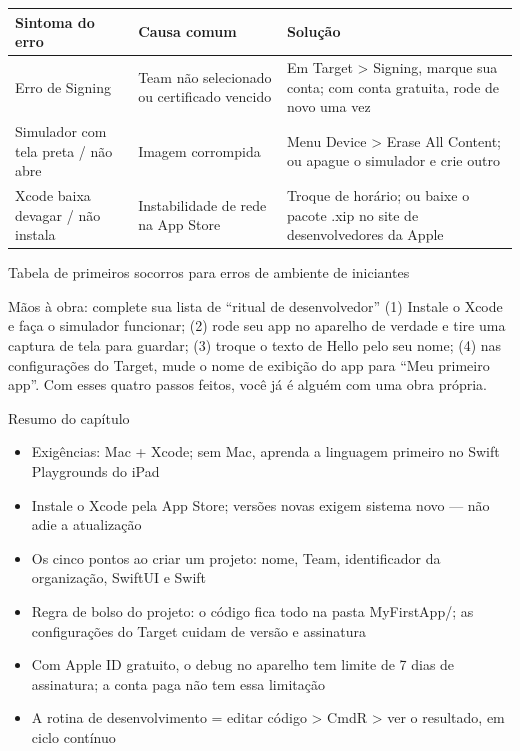 \begin{center}
\begin{tabularx}{\linewidth}{|X|X|X|}
\hline
\textbf{Sintoma do erro} & \textbf{Causa comum} & \textbf{Solução} \tabularnewline
\hline
Erro de Signing & Team não selecionado ou certificado vencido & Em Target > Signing, marque sua conta; com conta gratuita, rode de novo uma vez \tabularnewline
Simulador com tela preta / não abre & Imagem corrompida & Menu Device > Erase All Content; ou apague o simulador e crie outro \tabularnewline
Xcode baixa devagar / não instala & Instabilidade de rede na App Store & Troque de horário; ou baixe o pacote .xip no site de desenvolvedores da Apple \tabularnewline
\hline
\end{tabularx}
\end{center}

\begin{center}\small\color{gray}Tabela de primeiros socorros para erros de ambiente de iniciantes\end{center}

\begin{tcbpractice}{Mãos à obra: complete sua lista de “ritual de desenvolvedor”}
(1) Instale o Xcode e faça o simulador funcionar; (2) rode seu app no aparelho de verdade e tire uma captura de tela para guardar; (3) troque o texto de Hello pelo seu nome; (4) nas configurações do Target, mude o nome de exibição do app para “Meu primeiro app”. Com esses quatro passos feitos, você já é alguém com uma obra própria.

\end{tcbpractice}

\begin{tcbsummary}{Resumo do capítulo}
\begin{itemize}
  \item Exigências: Mac + Xcode; sem Mac, aprenda a linguagem primeiro no Swift Playgrounds do iPad
  \item Instale o Xcode pela App Store; versões novas exigem sistema novo — não adie a atualização
  \item Os cinco pontos ao criar um projeto: nome, Team, identificador da organização, SwiftUI e Swift
  \item Regra de bolso do projeto: o código fica todo na pasta MyFirstApp/; as configurações do Target cuidam de versão e assinatura
  \item Com Apple ID gratuito, o debug no aparelho tem limite de 7 dias de assinatura; a conta paga não tem essa limitação
  \item A rotina de desenvolvimento = editar código > CmdR > ver o resultado, em ciclo contínuo
\end{itemize}

\end{tcbsummary}
